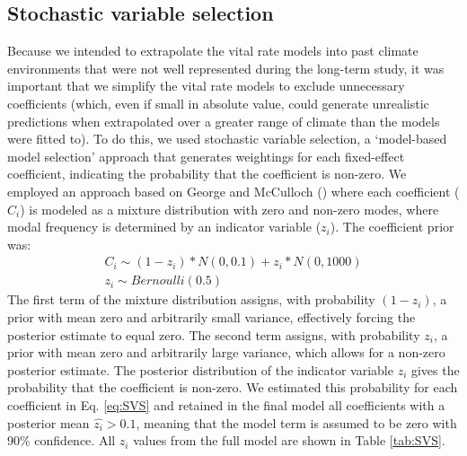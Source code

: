 \documentclass[12pt]{article}\usepackage[]{graphicx}\usepackage[]{color}
\begin{document}
\subsection*{Stochastic variable selection}

Because we intended to extrapolate the vital rate models into past climate environments that were not well represented during the long-term study, it was important that we simplify the vital rate models to exclude unnecessary coefficients (which, even if small in absolute value, could generate unrealistic predictions when extrapolated over a greater range of climate than the models were fitted to). To do this, we used stochastic variable selection, a `model-based model selection' approach \citep{hooten2015guide} that generates weightings for each fixed-effect coefficient, indicating the probability that the coefficient is non-zero. We employed an approach based on George and McCulloch (\citeyear{george1993variable}) where each coefficient ($C_{i}$) is modeled as a mixture distribution with zero and non-zero modes, where modal frequency is determined by an indicator variable ($z_i$). The coefficient prior was:
\begin{align}\label{eq:SVS}
C_i \sim (1-z_i) * N(0,0.1) + z_i * N(0,1000) \\
z_i \sim Bernoulli(0.5)
\end{align}
The first term of the mixture distribution assigns, with probability $(1-z_i)$, a prior with mean zero and arbitrarily small variance, effectively forcing the posterior estimate to equal zero. The second term assigns, with probability $z_i$, a prior with mean zero and arbitrarily large variance, which allows for a non-zero posterior estimate. The posterior distribution of the indicator variable $z_i$ gives the probability that the coefficient is non-zero. We estimated this probability for each coefficient in Eq. \ref{eq:SVS} and retained in the final model all coefficients with a posterior mean $\hat{z_i} > 0.1$, meaning that the model term is assumed to be zero with 90\% confidence. All $z_i$ values from the full model are shown in Table \ref{tab:SVS}.
\end{document}
